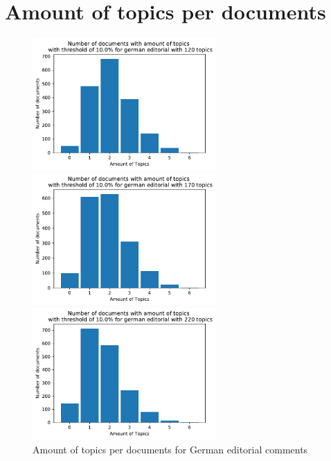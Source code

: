 \section{Amount of topics per documents}
\begin{figure}[t]
	\centering
	\includegraphics[width=7cm]{gfx/GrafikenFinal/germaneditorialnmf_topPerdoc120.pdf}\par\medskip
	\begin{minipage}{0.5\textwidth}
		\centering
		\includegraphics[width=7cm]{gfx/GrafikenFinal/germaneditorialnmf_topPerdoc170.pdf}
	\end{minipage}%
	\begin{minipage}{0.5\textwidth}
		\centering
		\includegraphics[width=7cm]{gfx/GrafikenFinal/germaneditorialnmf_topPerdoc220.pdf}
	\end{minipage}
	\caption[]{Amount of topics per documents for German editorial comments}
\end{figure}

